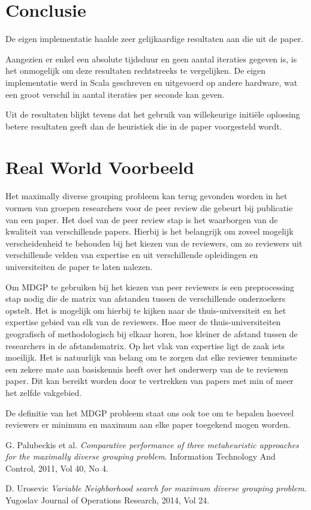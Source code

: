 \documentclass[pdftex,12pt,a4paper]{article}
\begin{document}
\section{Conclusie}
De eigen implementatie haalde zeer gelijkaardige resultaten aan die uit de paper. 

Aangezien er enkel een absolute tijdsduur en geen aantal iteraties gegeven is, is het onmogelijk om deze resultaten rechtstreeks te vergelijken. De eigen implementatie werd in Scala geschreven en uitgevoerd op andere hardware, wat een groot verschil in aantal iteraties per seconde kan geven.

Uit de resultaten blijkt tevens dat het gebruik van willekeurige initi\"ele oplossing betere resultaten geeft dan de heuristiek die in de paper voorgesteld wordt. 

\section{Real World Voorbeeld}

Het maximally diverse grouping probleem kan terug gevonden worden in het vormen van groepen researchers voor de peer review die gebeurt bij publicatie van een paper. Het doel van de peer review stap is het waarborgen van de kwaliteit van verschillende papers. Hierbij is het belangrijk om zoveel mogelijk verscheidenheid te behouden bij het kiezen van de reviewers, om zo reviewers uit verschillende velden van expertise en uit verschillende opleidingen en universiteiten de paper te laten nalezen.

Om MDGP te gebruiken bij het kiezen van peer reviewers is een preprocessing stap nodig die de matrix van afstanden tussen de verschillende onderzoekers opstelt. Het is mogelijk om hierbij te kijken naar de thuis-universiteit en het expertise gebied van elk van de reviewers. Hoe meer de thuis-universiteiten geografisch of methodologisch bij elkaar horen, hoe kleiner de afstand tussen de researchers in de afstandsmatrix. Op het vlak van expertise ligt de zaak iets moeilijk. Het is natuurlijk van belang om te zorgen dat elke reviewer tenminste een zekere mate aan basiskennis heeft over het onderwerp van de te reviewen paper. Dit kan bereikt worden door te vertrekken van papers met min of meer het zelfde vakgebied.

De definitie van het MDGP probleem staat ons ook toe om te bepalen hoeveel reviewers er minimum en maximum aan elke paper toegekend mogen worden. 

\newpage
\begin{thebibliography}{9}
  G. Palubeckis et al.
  \emph{Comparative performance of three metaheuristic approaches
for the maximally diverse grouping problem}.
  Information Technology And Control, 2011, Vol 40, No 4.
  
 D. Urosevic
 \emph{Variable Neighborhood search for maximum diverse grouping problem}.
 Yugoslav Journal of Operations Research, 2014, Vol 24.

\end{thebibliography}
\end{document}
